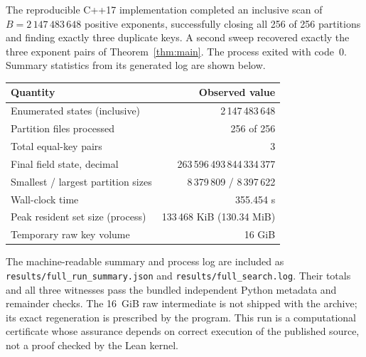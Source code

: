 The reproducible C++17 implementation completed an inclusive scan of
\(B=2\,147\,483\,648\) positive exponents, successfully closing all
256 of 256 partitions and finding exactly three duplicate keys. A
second sweep recovered exactly the three exponent pairs of
Theorem~\ref{thm:main}. The process exited with code~0. Summary
statistics from its generated log are shown below.
\begin{center}
\small
\begin{tabular}{@{}l r@{}}\toprule
Quantity & Observed value\\\midrule
Enumerated states (inclusive) & 2\,147\,483\,648\\
Partition files processed & 256 of 256\\
Total equal-key pairs & 3\\
Final field state, decimal & 263\,596\,493\,844\,334\,377\\
Smallest / largest partition sizes & 8\,379\,809 / 8\,397\,622\\
Wall-clock time & 355.454 s\\
Peak resident set size (process) & 133\,468 KiB (130.34 MiB)\\
Temporary raw key volume & 16 GiB\\\bottomrule
\end{tabular}
\end{center}
The machine-readable summary and process log are included as
\texttt{results/full\_run\_summary.json} and
\texttt{results/full\_search.log}. Their totals and all three
witnesses pass the bundled independent Python metadata and remainder
checks. The 16~GiB raw intermediate is not shipped with the archive;
its exact regeneration is prescribed by the program. This run is a
computational certificate whose assurance depends on correct execution
of the published source, not a proof checked by the Lean kernel.
